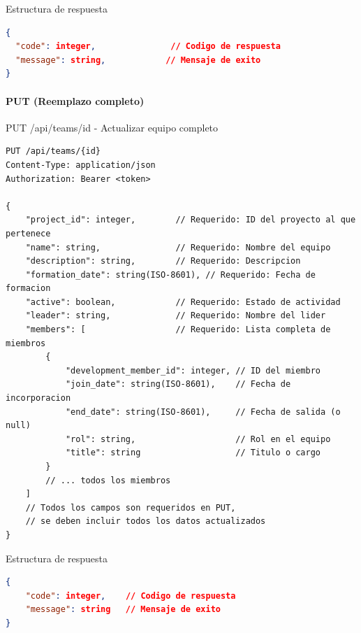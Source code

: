 \documentclass[11pt,a4paper]{article}
\begin{document}
\begin{center}
	\begin{minipage}{\textwidth}
		\begin{codebox}{Estructura de respuesta}
			\begin{lstlisting}[language=json]
{
  "code": integer,               // Codigo de respuesta
  "message": string,            // Mensaje de exito
}
\end{lstlisting}
		\end{codebox}
	\end{minipage}
\end{center}

\paragraph{PUT (Reemplazo completo)}
\begin{center}
    \begin{minipage}{\textwidth}
        \begin{codebox}{PUT /api/teams/{id} - Actualizar equipo completo}
            \begin{lstlisting}[language=HTTP]
PUT /api/teams/{id}
Content-Type: application/json
Authorization: Bearer <token>

{
    "project_id": integer,        // Requerido: ID del proyecto al que pertenece
    "name": string,               // Requerido: Nombre del equipo
    "description": string,        // Requerido: Descripcion
    "formation_date": string(ISO-8601), // Requerido: Fecha de formacion
    "active": boolean,            // Requerido: Estado de actividad
    "leader": string,             // Requerido: Nombre del lider
    "members": [                  // Requerido: Lista completa de miembros
        {
            "development_member_id": integer, // ID del miembro
            "join_date": string(ISO-8601),    // Fecha de incorporacion
            "end_date": string(ISO-8601),     // Fecha de salida (o null)
            "rol": string,                    // Rol en el equipo
            "title": string                   // Titulo o cargo
        }
        // ... todos los miembros
    ]
    // Todos los campos son requeridos en PUT,
    // se deben incluir todos los datos actualizados
}
\end{lstlisting}
        \end{codebox}
    \end{minipage}
\end{center}

\begin{center}
    \begin{minipage}{\textwidth}
        \begin{codebox}{Estructura de respuesta}
            \begin{lstlisting}[language=json]
{
    "code": integer,    // Codigo de respuesta
    "message": string   // Mensaje de exito
}
\end{lstlisting}
        \end{codebox}
    \end{minipage}
\end{center}
\end{document}
